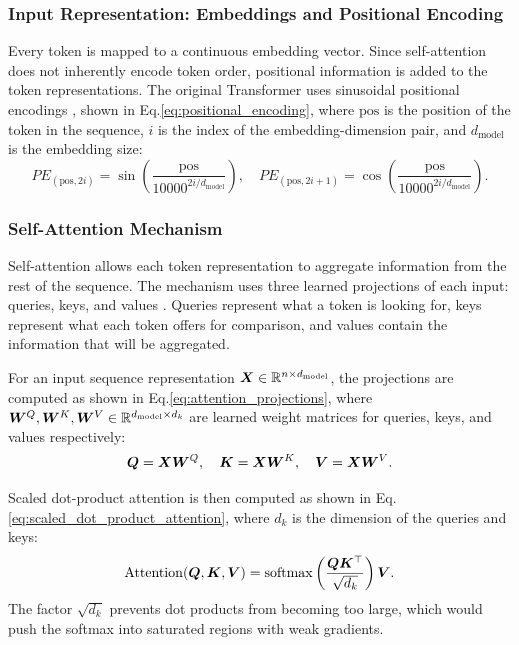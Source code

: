 \subsubsection{Input Representation: Embeddings and Positional Encoding}

 Every token is mapped to a continuous embedding vector. Since self-attention does not inherently encode token order, positional information is added to the token representations. The original Transformer uses sinusoidal positional encodings \cite{vaswani2017attention}, shown in Eq.\eqref{eq:positional_encoding}, where $\text{pos}$ is the position of the token in the sequence, $i$ is the index of the embedding-dimension pair, and $d_{\text{model}}$ is the embedding size:
\begin{equation}
  \label{eq:positional_encoding}
    PE_{(\text{pos}, 2i)} = \sin\left(\frac{\text{pos}}{10000^{2i/d_{\text{model}}}}\right), \quad
    PE_{(\text{pos}, 2i+1)} = \cos\left(\frac{\text{pos}}{10000^{2i/d_{\text{model}}}}\right).
\end{equation}

\subsubsection{Self-Attention Mechanism}

Self-attention allows each token representation to aggregate information from the rest of the sequence. The mechanism uses three learned projections of each input: queries, keys, and values \cite{vaswani2017attention}. Queries represent what a token is looking for, keys represent what each token offers for comparison, and values contain the information that will be aggregated.

For an input sequence representation $\bm{X} \in \mathbb{R}^{n \times d_{\text{model}}}$, the projections are computed as shown in Eq.\eqref{eq:attention_projections}, where $\bm{W}^{Q}, \bm{W}^{K}, \bm{W}^{V} \in \mathbb{R}^{d_{\text{model}} \times d_k}$ are learned weight matrices for queries, keys, and values respectively:
\begin{equation}
  \label{eq:attention_projections}
    \bm{Q} = \bm{X}\bm{W}^{Q}, \quad
    \bm{K} = \bm{X}\bm{W}^{K}, \quad
    \bm{V} = \bm{X}\bm{W}^{V}.
\end{equation}

Scaled dot-product attention is then computed as shown in Eq.\eqref{eq:scaled_dot_product_attention}, where $d_k$ is the dimension of the queries and keys:
\begin{equation}
  \label{eq:scaled_dot_product_attention}
    \operatorname{Attention}(\bm{Q}, \bm{K}, \bm{V})
    =
    \operatorname{softmax}\left(\frac{\bm{Q}\bm{K}^{\top}}{\sqrt{d_k}}\right)\bm{V}.
\end{equation}
The factor $\sqrt{d_k}$ prevents dot products from becoming too large, which would push the softmax into saturated regions with weak gradients.

